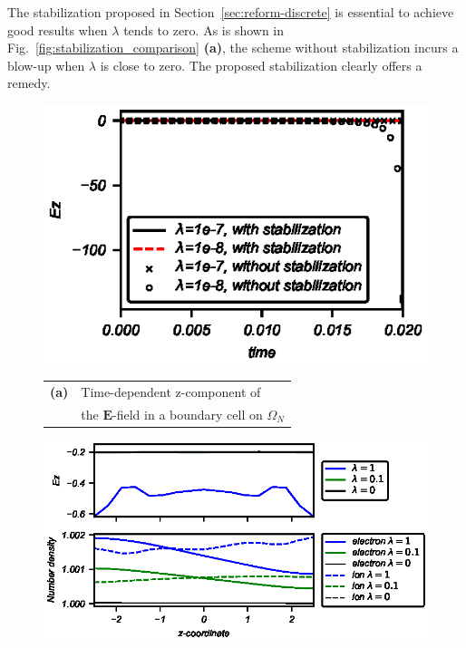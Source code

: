 \documentclass{article}
\begin{document}
The stabilization proposed in Section~\ref{sec:reform-discrete} is essential to achieve
good results when $\lambda$ tends to zero. As is shown in
Fig.~\ref{fig:stabilization_comparison} \textbf{(a)}, the scheme without stabilization incurs a blow-up
when $\lambda$ is close to zero. The proposed stabilization clearly offers a remedy.
\begin{figure}
    \centering
\begin{minipage}[t]{0.4\textwidth}\centering
  \includegraphics[width=\textwidth]{stabilizationComparision_stepVoltage.eps}

  \parbox{0.9\textwidth}{\begin{tabular}[c]{ll}
    \textbf{(a)} & Time-dependent z-component of \\ & the $\mathbf{E}$-field
    in a boundary cell on $\Omega_N$
  \end{tabular}}
\end{minipage}%
 \begin{minipage}[t]{0.6\textwidth}\centering
   \includegraphics[width=\textwidth]{data-vs-z_stepVoltage.eps}


\end{minipage}
\end{figure}
\end{document}

